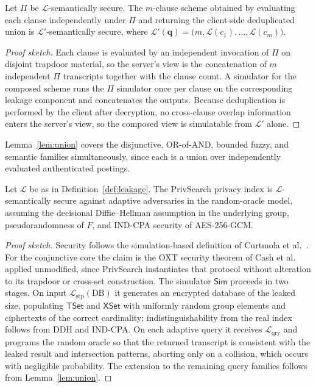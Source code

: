 \begin{lemma}
\label{lem:union}
Let $\Pi$ be $\mathcal{L}$-semantically secure. The $m$-clause scheme obtained by evaluating each clause independently under $\Pi$ and returning the client-side deduplicated union is $\mathcal{L}'$-semantically secure, where $\mathcal{L}'(\mathbf{q}) = \bigl(m, \mathcal{L}(c_1),\dots,\mathcal{L}(c_m)\bigr)$.
\end{lemma}

\begin{proof}[Proof sketch]
Each clause is evaluated by an independent invocation of $\Pi$ on disjoint trapdoor material, so the server's view is the concatenation of $m$ independent $\Pi$ transcripts together with the clause count. A simulator for the composed scheme runs the $\Pi$ simulator once per clause on the corresponding leakage component and concatenates the outputs. Because deduplication is performed by the client after decryption, no cross-clause overlap information enters the server's view, so the composed view is simulatable from $\mathcal{L}'$ alone.
\end{proof}

Lemma~\ref{lem:union} covers the disjunctive, OR-of-AND, bounded fuzzy, and semantic families simultaneously, since each is a union over independently evaluated authenticated postings.

\begin{theorem}
\label{thm:leakage_security}
Let $\mathcal{L}$ be as in Definition~\ref{def:leakage}. The PrivSearch privacy index is $\mathcal{L}$-semantically secure against adaptive adversaries in the random-oracle model, assuming the decisional Diffie--Hellman assumption in the underlying group, pseudorandomness of $F$, and IND-CPA security of AES-256-GCM.
\end{theorem}

\begin{proof}[Proof sketch]
Security follows the simulation-based definition of Curtmola et al.~\cite{Curtmola}. For the conjunctive core the claim is the OXT security theorem of Cash et al.~\cite{Cash} applied unmodified, since PrivSearch instantiates that protocol without alteration to its trapdoor or cross-set construction. The simulator $\mathsf{Sim}$ proceeds in two stages. On input $\mathcal{L}_{\mathrm{stp}}(\mathrm{DB})$ it generates an encrypted database of the leaked size, populating $\mathsf{TSet}$ and $\mathsf{XSet}$ with uniformly random group elements and ciphertexts of the correct cardinality; indistinguishability from the real index follows from DDH and IND-CPA. On each adaptive query it receives $\mathcal{L}_{\mathrm{qry}}$ and programs the random oracle so that the returned transcript is consistent with the leaked result and intersection patterns, aborting only on a collision, which occurs with negligible probability. The extension to the remaining query families follows from Lemma~\ref{lem:union}.
\end{proof}

